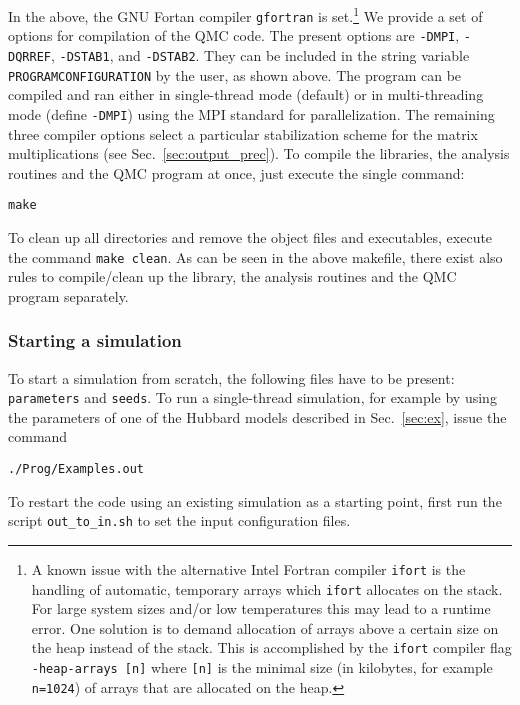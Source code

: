\documentclass{SciPost}
\begin{document}
In the above, the GNU Fortan compiler \texttt{gfortran} is set.\footnote{A known issue with the alternative Intel Fortran compiler \texttt{ifort} is the handling of automatic, temporary arrays 
which \texttt{ifort} allocates on the stack. For large system sizes and/or low temperatures this may lead to 
a runtime error. One solution is to demand allocation of arrays above a certain size on the heap instead of the stack. 
This is accomplished by the \texttt{ifort} compiler flag \texttt{-heap-arrays [n]} where \texttt{[n]} is the minimal size (in kilobytes, for example \texttt{n=1024}) of arrays 
that are allocated on the heap.}
We provide a set of options for compilation of the QMC code. The present options are \texttt{-DMPI}, \texttt{-DQRREF}, \texttt{-DSTAB1}, and \texttt{-DSTAB2}. 
They can be included in the string variable \texttt{PROGRAMCONFIGURATION} by the user, as shown above.
The program can be compiled and ran either in single-thread mode (default) or 
in multi-threading mode (define \texttt{-DMPI}) using the MPI standard for parallelization. The remaining three compiler options select a particular stabilization scheme for the matrix multiplications (see Sec.~\ref{sec:output_prec}).
To compile the libraries, the analysis routines and the QMC program at once, just execute the single command:
\begin{verbatim}
make
\end{verbatim}
To clean up all directories and remove the object files and executables, execute the command \texttt{make clean}. As can be seen in the above makefile, there exist also rules to compile/clean up the library, the analysis routines and the QMC program separately.  

%
\subsubsection{Starting a simulation}
%
To start a simulation from scratch, the following files have to be present: \texttt{parameters} and \texttt{seeds}. 
To run a single-thread simulation, for example by using the parameters of one of the  Hubbard models described in Sec.~\ref{sec:ex}, issue the command
\begin{verbatim}
./Prog/Examples.out
\end{verbatim}
To restart the code using an existing simulation as a starting point, first run the script \texttt{out\_to\_in.sh} to set 
the input configuration files.
%
\end{document}
